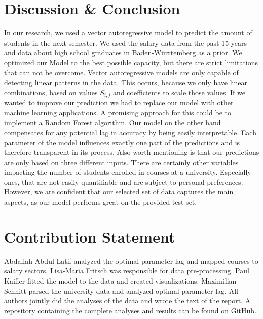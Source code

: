 \documentclass{article}
\theoremstyle{plain}
\theoremstyle{definition}
\theoremstyle{remark}
\begin{document}
\section{Discussion \& Conclusion}\label{sec:conclusion}
In our research, we used a vector autoregressive model to predict the amount of students in the next semester. 
We used the salary data from the past 15 years and data about high school graduates in Baden-Würrtemberg as a prior. We optimized our Model to the best
possible capacity,
but there are strict limitations that can not be overcome. Vector autoregressive models are only capable of detecting linear patterns in the data.
This occurs, because we only have linear combinations, based on values $S_{i,j}$ and coefficients to scale those values. If we wanted to improve
our prediction we had to replace our model with other machine learning applications.
A promising approach for this could be to implement a Random Forest algorithm.
Our model on the other hand compensates for any potential lag in accuracy by being easily interpretable. Each parameter of the model influences exactly
one part of the predictions and is therefore transparent in its process.
Also worth mentioning is that our predictions are only based on three different inputs. There are certainly other 
variables impacting the number of students enrolled in courses at a university. Especially ones, that are not easily quantifiable and are subject to
personal preferences. However, we are confident that our selected set of data captures the main aspects, as our model performs great on the provided test set.



\section*{Contribution Statement}
Abdallah Abdul-Latif analyzed the optimal parameter lag and mapped courses to salary sectors.
Lisa-Maria Fritsch was responsible for data pre-processing.
Paul Kaifler fitted the model to the data and created visualizations.
Maximilian Schnitt parsed the university data and analyzed optimal parameter lag.
All authors jointly did the analyses of the data and wrote the text of the report.
A repository containing the complete analyses and results can be found on \href{https://github.com/mxs01/AnalysingStudentDevelopment}{GitHub}.

\end{document}
